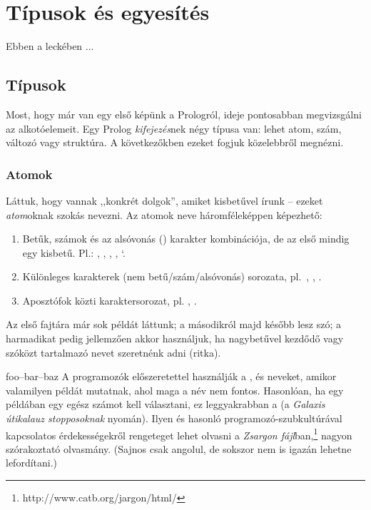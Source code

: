 
\chapter{Típusok és egyesítés}
Ebben a leckében ...
\section{Típusok}
Most, hogy már van egy első képünk a Prologról,
ideje pontosabban megvizsgálni az alkotóelemeit.
Egy Prolog \emph{kifejezés}\/nek négy típusa van:
lehet atom, szám, változó vagy struktúra. A
következőkben ezeket fogjuk közelebbről
megnézni.
\subsection*{Atomok}
Láttuk, hogy vannak ,,konkrét dolgok'', amiket
kisbetűvel írunk -- ezeket \emph{atom}\/oknak szokás
nevezni. Az atomok neve háromféleképpen képezhető:
\begin{enumerate}
\item Betűk, számok és az alsóvonás (\pr{\_})
  karakter kombinációja, de az első mindig egy
  kisbetű. Pl.: , , ,
  , `.
\item Különleges karakterek (nem
  betű/szám/alsóvonás) sorozata, pl.~,
  \pr{==>}, \pr{+}.
\item Aposztófok közti karaktersorozat,
  pl. , .
\end{enumerate}
Az első fajtára már sok példát láttunk; a másodikról
majd később lesz szó; a harmadikat pedig jellemzően
akkor használjuk, ha nagybetűvel kezdődő vagy
szóközt tartalmazó nevet szeretnénk adni (ritka).

\begin{infobox}{}{foo--bar--baz}
A programozók előszeretettel használják a ,
 és  neveket, amikor valamilyen
példát mutatnak, ahol maga a név nem
fontos. Hasonlóan, ha egy példában egy egész számot
kell választani, ez leggyakrabban a  (a
\emph{Galaxis útikalauz stopposoknak} nyomán). Ilyen
és hasonló programozó-szubkultúrával kapcsolatos
érdekességekről rengeteget lehet olvasni a \emph{Zsargon
  fájl}\/ban,\footnote[2]{http://www.catb.org/jargon/html/}
nagyon szórakoztató olvasmány. (Sajnos csak angolul,
de sokszor nem is igazán lehetne lefordítani.)
\end{infobox}

